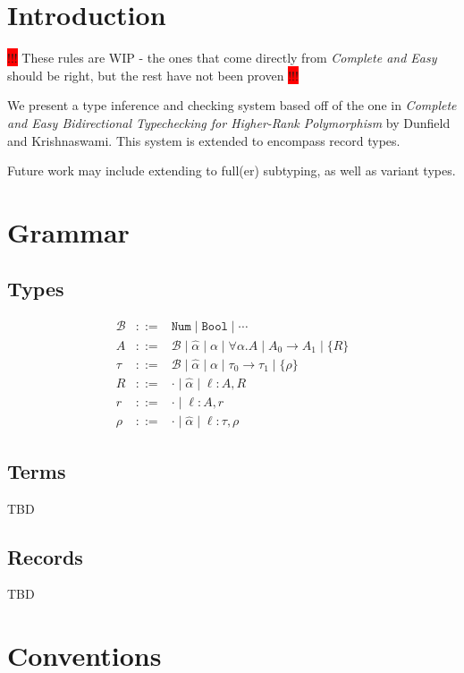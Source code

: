 \documentclass{article}
\newcommand{\consider}[1]{\colorbox{red}{!!!} #1 \colorbox{red}{!!!}}
\newcommand{\B}{\mathcal{B}}
\newcommand{\bottom}{\perp}
\newcommand{\define}{::=}
\newcommand{\ev}{\hat}
\begin{document}
\section{Introduction}
\consider{These rules are WIP - the ones that come directly from
  \textit{Complete and Easy} should be right, but the rest have not been proven}

We present a type inference and checking system based off of the one in
\textit{Complete and Easy Bidirectional Typechecking for Higher-Rank
  Polymorphism} by Dunfield and Krishnaswami. This system is extended to
encompass record types.

Future work may include extending to full(er) subtyping, as well as variant
types.

\section{Grammar}

\subsection{Types}
\[\begin{array}{rcl}
\B & \define & \texttt{Num} \mid \texttt{Bool} \mid \cdots
\\
A & \define & \B \mid \ev\alpha \mid \alpha \mid \forall \alpha. A \mid A_0 \to A_1 \mid \{R\}
\\
\tau & \define & \B \mid \ev\alpha \mid \alpha \mid \tau_0 \to \tau_1 \mid \{\rho\}
\\
R & \define & \cdot \mid \ev\alpha \mid \ell : A, R
\\
r & \define & \cdot \mid \ell : A, r
\\
\rho & \define & \cdot \mid \ev\alpha \mid \ell : \tau, \rho
\end{array}
\]

\subsection{Terms}
TBD

\subsection{Records}
TBD

\section{Conventions}
\end{document}
